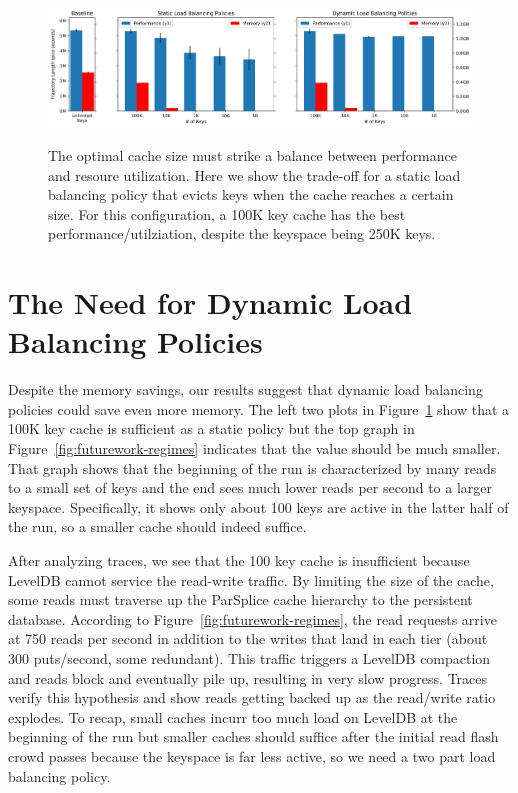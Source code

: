 \begin{figure}[tbh]
  \noindent\includegraphics[width=1\textwidth]{figures/methodology-tradeoff.png}\\
  \caption{The optimal cache size must strike a balance between performance and
  resoure utilization. Here we show the trade-off for a static load balancing
  policy that evicts keys when the cache reaches a certain size. For this
  configuration, a 100K key cache has the best performance/utilziation, despite
  the keyspace being 250K keys. \label{fig:methodology-tradeoff}}
\end{figure}

\section{The Need for Dynamic Load Balancing Policies}
\label{sec:the-need-for-dynamic-load-balancing-policies}

Despite the memory savings, our results suggest that dynamic load balancing
policies could save even more memory.  The left two plots in
Figure~\ref{fig:methodology-tradeoff} show that a 100K key cache is sufficient
as a static policy but the top graph in Figure~\ref{fig:futurework-regimes}
indicates that the value should be much smaller. That graph shows that the
beginning of the run is characterized by many reads to a small set of keys and
the end sees much lower reads per second to a larger keyspace. Specifically, it
shows only about 100 keys are active in the latter half of the run, so a
smaller cache should indeed suffice. 

After analyzing traces, we see that the 100 key cache is insufficient because
LevelDB cannot service the read-write traffic. By limiting the size of the
cache, some reads must traverse up the ParSplice cache hierarchy to the
persistent database.  According to Figure~\ref{fig:futurework-regimes}, the
read requests arrive at 750 reads per second in addition to the writes that
land in each tier (about 300 puts/second, some redundant). This traffic
triggers a LevelDB compaction and reads block and eventually pile up, resulting
in very slow progress. Traces verify this hypothesis and show reads getting
backed up as the read/write ratio explodes. To recap, small caches incurr too
much load on LevelDB at the beginning of the run but smaller caches should
suffice after the initial read flash crowd passes because the keyspace is far
less active, so we need a two part load balancing policy.

